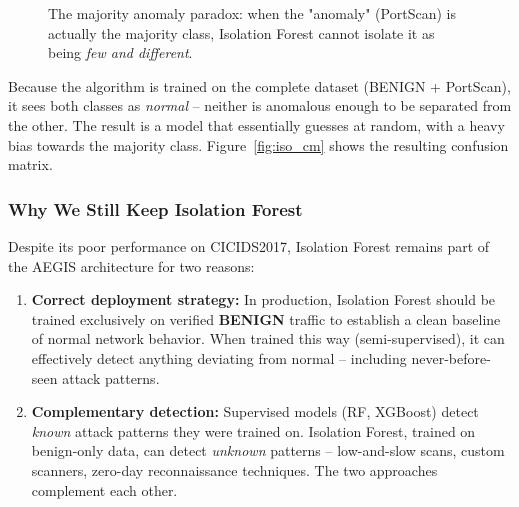 \documentclass[12pt,a4paper]{report}
\begin{document}
\begin{figure}[H]
\centering
{}
\caption{The majority anomaly paradox: when the "anomaly" (PortScan) is actually the majority class, Isolation Forest cannot isolate it as being \textit{few and different}.}
\label{fig:majority_paradox}
\end{figure}

Because the algorithm is trained on the complete dataset (BENIGN + PortScan), it sees both classes as \textit{normal} -- neither is anomalous enough to be separated from the other. The result is a model that essentially guesses at random, with a heavy bias towards the majority class. Figure~\ref{fig:iso_cm} shows the resulting confusion matrix.

\subsubsection{Why We Still Keep Isolation Forest}

Despite its poor performance on CICIDS2017, Isolation Forest remains part of the AEGIS architecture for two reasons:

\begin{enumerate}
    \item \textbf{Correct deployment strategy:} In production, Isolation Forest should be trained exclusively on verified \textbf{BENIGN} traffic to establish a clean baseline of normal network behavior. When trained this way (semi-supervised), it can effectively detect anything deviating from normal -- including never-before-seen attack patterns.

    \item \textbf{Complementary detection:} Supervised models (RF, XGBoost) detect \textit{known} attack patterns they were trained on. Isolation Forest, trained on benign-only data, can detect \textit{unknown} patterns -- low-and-slow scans, custom scanners, zero-day reconnaissance techniques. The two approaches complement each other.
\end{enumerate}
\end{document}
